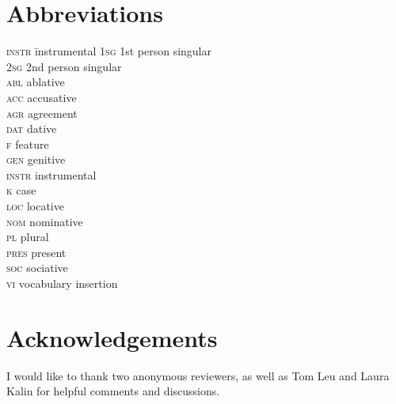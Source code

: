 \documentclass[output=paper]{langscibook}
\begin{document}
\section*{Abbreviations}
\begin{multicols}{2}
\begin{tabbing}
\textsc{instr}\hspace{.5ex} \= instrumental\kill
\textsc{1sg} \> 1st person singular         \\
\textsc{2sg} \> 2nd person singular         \\
\textsc{abl} \> ablative                 \\
\textsc{acc} \> accusative         \\
\textsc{agr} \> agreement      \\
\textsc{dat} \> dative             \\
\textsc{f}   \> feature          \\
\textsc{gen} \> genitive\\
\textsc{instr} \> instrumental         \\
 \textsc{k}     \> case                 \\
 \textsc{loc}   \> locative             \\
 \textsc{nom}   \> nominative           \\
 \textsc{pl}    \> plural               \\
 \textsc{pres}  \> present              \\
 \textsc{soc}   \> sociative            \\
 \textsc{vi}    \> vocabulary insertion
\end{tabbing}
\end{multicols}

\section*{Acknowledgements}
I would like to thank two anonymous reviewers, as well as Tom Leu and Laura Kalin for helpful comments and discussions.

\printbibliography[heading=subbibliography,notkeyword=this]
\end{document}
